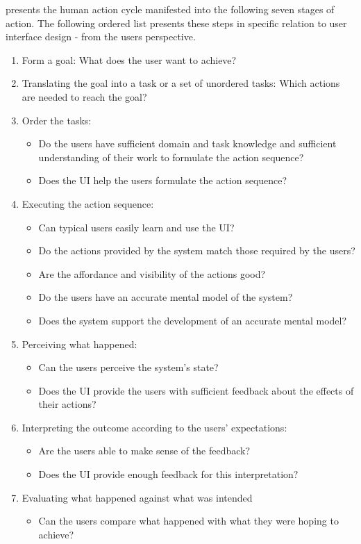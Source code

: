 \cite{norman2002design} presents the human action cycle manifested into the following seven stages of action. The following ordered list presents these steps in specific relation to user interface design - from the users perspective.
\begin{enumerate}

  \item Form a goal: What does the user want to achieve?
  \item Translating the goal into a task or a set of unordered tasks: Which actions are needed to reach the goal?
  \item Order the tasks: 
  \begin{itemize}
     \item Do the users have sufficient domain and task knowledge and sufficient understanding of their work to formulate the action sequence?

     \item Does the UI help the users formulate the action sequence?

  \end{itemize}  
  \item Executing the action sequence:
  \begin{itemize}
     \item Can typical users easily learn and use the UI?
     \item Do the actions provided by the system match those required by the users?
     \item Are the affordance and visibility of the actions good?
     \item Do the users have an accurate mental model of the system?
     \item Does the system support the development of an accurate mental model?
  \end{itemize}  
  \item Perceiving what happened:
  \begin{itemize}
     \item Can the users perceive the system’s state?
     \item Does the UI provide the users with sufficient feedback about the effects of their actions?
  \end{itemize}  
  \item Interpreting the outcome according to the users’ expectations:
  \begin{itemize}
     \item Are the users able to make sense of the feedback?
     \item Does the UI provide enough feedback for this interpretation?
  \end{itemize}  
  \item Evaluating what happened against what was intended
  \begin{itemize}
     \item Can the users compare what happened with what they were hoping to achieve?
  \end{itemize}  

\end{enumerate}


